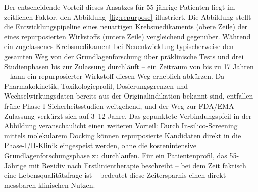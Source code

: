 ﻿\documentclass[12pt,a4paper]{article}
\theoremstyle{definition}
\begin{document}
Der entscheidende Vorteil dieses Ansatzes für 55-jährige Patienten liegt im
zeitlichen Faktor, den Abbildung~\ref{fig:repurpose} illustriert. Die Abbildung
stellt die Entwicklungspipeline eines neuartigen Krebsmedikaments (obere Zeile)
der eines repurposierten Wirkstoffs (untere Zeile) vergleichend gegenüber. Während
ein zugelassenes Krebsmedikament bei Neuentwicklung typischerweise den gesamten
Weg von der Grundlagenforschung über präklinische Tests und drei Studienphasen bis
zur Zulassung durchläuft -- ein Zeitraum von bis zu 17 Jahren \cite{mccabe2015} --
kann ein repurposierter Wirkstoff diesen Weg erheblich abkürzen. Da Pharmakokinetik,
Toxikologieprofil, Dosierungsgrenzen und Wechselwirkungsdaten bereits aus der
Originalindikation bekannt sind, entfallen frühe Phase-I-Sicherheitsstudien
weitgehend, und der Weg zur FDA/EMA-Zulassung verkürzt sich auf 3--12 Jahre.
Das gepunktete Verbindungspfeil in der Abbildung veranschaulicht einen weiteren
Vorteil: Durch In-silico-Screening mittels molekularem Docking können repurposierte
Kandidaten direkt in die Phase-I/II-Klinik eingespeist werden, ohne die
kostenintensive Grundlagenforschungsphase zu durchlaufen. Für ein Patientenprofil,
das 55-Jährige mit Rezidiv nach Erstlinientherapie beschreibt -- bei dem Zeit
faktisch eine Lebensqualitätsfrage ist -- bedeutet diese Zeitersparnis einen
direkt messbaren klinischen Nutzen.
\end{document}
